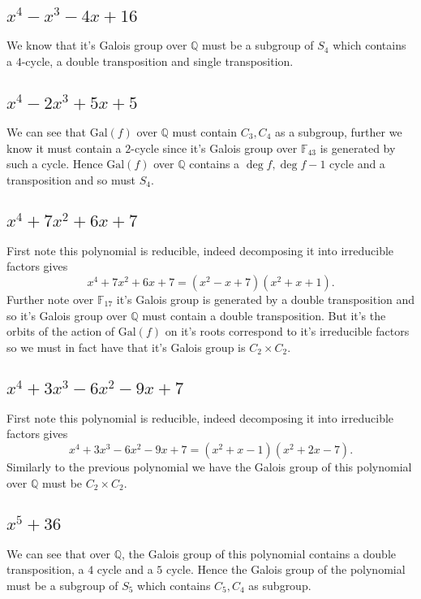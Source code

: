 \documentclass{article}
\begin{document}
\subsection{$x^4-x^3-4x+16$    }

We know that it's Galois group over $\mathbb{Q}$ must be a subgroup of $S_4$ which contains a $4$-cycle,  a double transposition and single transposition.  

\subsection{$ x^4 - 2x^3 + 5x + 5$     }
We can see that $\text{Gal} (f)$ over $\mathbb{Q}$ must contain $C_3,C_4$ as a subgroup,  further we know it must contain a $2$-cycle since it's Galois group over $\mathbb{F}_{43}$ is generated by such a cycle.  Hence $\text{Gal} (f)$ over $\mathbb{Q}$ contains a $\deg f,\deg f-1$ cycle and a transposition and so must $S_4$. 



\subsection{$x^4 + 7x^2 + 6x + 7$    }

First note this polynomial is reducible,  indeed decomposing it into irreducible factors gives
\[x^4 + 7x^2 + 6x + 7=(x^2-x+7)(x^2+x+1).  \]
Further note over $\mathbb{F}_{17}$ it's Galois group is generated by a double transposition and so it's Galois group over $\mathbb{Q}$ must contain a double transposition.  But it's the orbits of the action of $\text{Gal}(f)$ on it's roots correspond to it's irreducible factors so we must in fact have that it's Galois group is $C_2\times C_2$.


\subsection{$x^4 + 3x^3 - 6x^2 - 9x + 7$    }

First note this polynomial is reducible,  indeed decomposing it into irreducible factors gives
\[x^4 + 3x^3 - 6x^2 - 9x + 7=(x^2+x-1)(x^2+2x-7).  \]
Similarly to the previous polynomial we have the Galois group of this polynomial over $\mathbb{Q}$ must be $C_2\times C_2$.

\subsection{$ x^5 + 36$   }
We can see that over $\mathbb{Q}$,  the Galois group of this polynomial contains a double transposition,  a $4$ cycle and a $5$ cycle.  Hence the Galois group of the polynomial must be a subgroup of $S_5$ which contains $C_5,C_4$ as subgroup.
\end{document}
